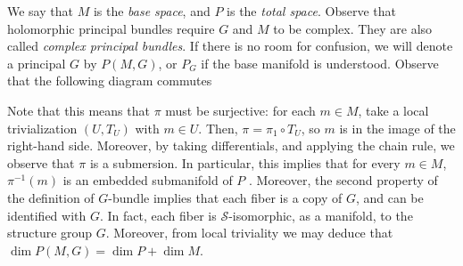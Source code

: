 We say that \(M\) is the \textit{base space}, and \(P\) is the \textit{total space}. Observe that holomorphic principal bundles require \(G\) and \(M\) to be complex. They are also called \textit{complex principal bundles}. If there is no room for confusion, we will denote a principal \(G\) by \(P(M,G)\), or \(P_G\) if the base manifold is understood. Observe that the following diagram commutes

\begin{center}
\end{center}

Note that this means that \(\pi\) must be surjective: for each \(m \in M\), take a local trivialization \((U, T_U)\) with \(m \in U\). Then, \(\pi=\pi_1 \circ T_U\), so \(m\) is in the image of the right-hand side. Moreover, by taking differentials, and applying the chain rule, we observe that \(\pi\) is a submersion. In particular, this implies that for every \(m \in M\), \(\pi^{-1}(m)\) is an embedded submanifold of \(P\) \parencite[Cor. 5.13]{lee_introSM}. Moreover, the second property of the definition of \(G\)-bundle implies that each fiber is a copy of \(G\), and can be identified with \(G\). In fact, each fiber is \(\mathcal{S}\)-isomorphic, as a manifold, to the structure group \(G\). Moreover, from local triviality we may deduce that \(\dim P(M,G)=\dim P + \dim M\). \\

